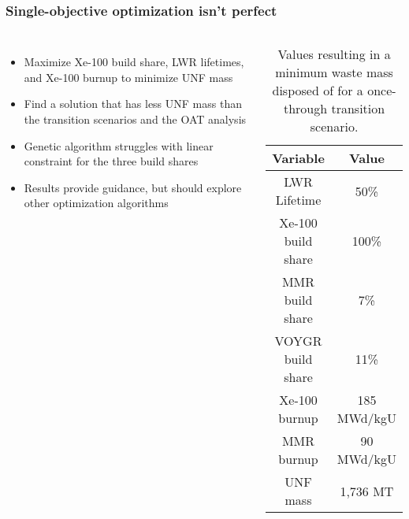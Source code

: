 \begin{frame}
    \frametitle{Single-objective optimization isn't perfect}
    \begin{columns}
        \column[t]{5cm}
        \begin{itemize}
            \item Maximize Xe-100 build share, LWR lifetimes,
                  and Xe-100 burnup to minimize \gls{UNF} mass
            \item Find a solution that has less UNF mass than the 
                  transition scenarios and the OAT analysis
            \item<2-> Genetic algorithm struggles with linear constraint for 
                  the three build shares
            \item<3-> Results provide guidance, but should explore 
                  other optimization algorithms
        \end{itemize}

        \column[t]{5.5cm}
        \begin{table}[h!]
            \centering 
            \caption{Values resulting in a minimum waste mass disposed of for 
                      a once-through transition scenario.}
            \label{tab:soga_ot_waste}
            \vspace{-0.5cm}
            \begin{tabular}{c c}
                \hline
                Variable & Value \\
                \hline
                LWR Lifetime & 50\%\\
                Xe-100 build share & 100\%\\
                MMR build share & 7\%\\
                VOYGR build share & 11\%\\
                Xe-100 burnup & 185 MWd/kgU\\
                MMR burnup & 90 MWd/kgU\\
                \hline
                UNF mass & 1,736 MT \\
                \hline
            \end{tabular}
        \end{table}
    \end{columns}
    
\end{frame}